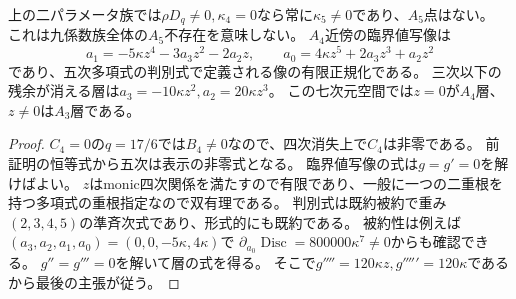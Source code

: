 \begin{corollary}
上の二パラメータ族では$\rho D_q\ne0,\kappa_4=0$なら常に$\kappa_5\ne0$であり、$A_5$点はない。
これは九係数族全体の$A_5$不存在を意味しない。
$A_4$近傍の臨界値写像は
\[
 a_1=-5\kappa z^4-3a_3z^2-2a_2z,\qquad
 a_0=4\kappa z^5+2a_3z^3+a_2z^2
\]
であり、五次多項式の判別式で定義される像の有限正規化である。
三次以下の残余が消える層は$a_3=-10\kappa z^2,a_2=20\kappa z^3$。
この七次元空間では$z=0$が$A_4$層、$z\ne0$は$A_3$層である。
\end{corollary}
\begin{proof}
$C_4=0$の$q=17/6$では$B_4\ne0$なので、四次消失上で$C_4$は非零である。
前証明の恒等式から五次は表示の非零式となる。
臨界値写像の式は$g=g'=0$を解けばよい。
$z$はmonic四次関係を満たすので有限であり、一般に一つの二重根を持つ多項式の重根指定なので双有理である。
判別式は既約被約で重み$(2,3,4,5)$の準斉次式であり、形式的にも既約である。
被約性は例えば$(a_3,a_2,a_1,a_0)=(0,0,-5\kappa,4\kappa)$で
$\partial_{a_0}\operatorname{Disc}=800000\kappa^7\ne0$からも確認できる。
$g''=g'''=0$を解いて層の式を得る。
そこで$g''''=120\kappa z,g'''''=120\kappa$であるから最後の主張が従う。
\end{proof}

